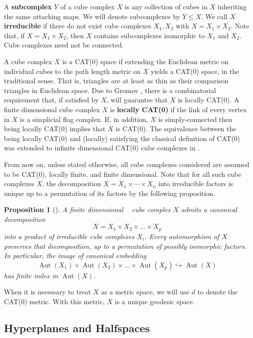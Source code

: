 \documentclass{amsart}
\newtheorem{proposition}[theorem]{Proposition}
\theoremstyle{definition}
\newtheorem*{Notation warning}{Warning on notations}
\newtheorem*{Sketch of proof}{Sketch of proof for Theorem C}
\DeclareMathOperator{\cat}{CAT(0)}
\def\aut{\mathop{\mathrm{Aut}}\nolimits}
\begin{document}
\begin{sloppypar}
A {\bf subcomplex} $Y$ of a cube complex $X$ is any collection of cubes in $X$ inheriting the same attaching maps. We will denote subcomplexes by $Y\le X$. We call $X$ {\bf irreducible} if there do not exist cube complexes $X_1,X_2$ with $X=X_1\times X_2$. Note that, if $X=X_1\times X_2$, then $X$ contains subcomplexes isomorphic to $X_1$ and $X_2$. Cube complexes need not be connected.
\medskip

A cube complex $X$ is a CAT(0) space if extending the Euclidean metric on individual cubes to the path length metric on $X$ yields a CAT(0) space, in the traditional sense. That is, triangles are at least as thin as their comparison triangles in Euclidean space. Due to Gromov \cite{Gro87}, there is a combinatorial requirement that, if satisfied by $X$, will guarantee that $X$ is locally CAT(0). A finite dimensional cube complex $X$ is {\bf locally CAT(0)} if the link of every vertex in $X$ is a simplicial flag complex. If, in addition, $X$ is simply-connected then being locally CAT(0) implies that $X$ is CAT(0). The equivalence between the being locally CAT(0) and (locally) satisfying the classical definition of CAT(0) was extended to infinite dimensional CAT(0) cube complexes in \cite{https://doi.org/10.1112/jtopol/jts035}.
\medskip

From now on, unless stated otherwise, all cube complexes considered are assumed to be CAT(0), locally finite, and finite dimensional. Note that for all such cube complexes $X$, the decomposition $X=X_1\times\cdots\times X_n$ into irreducible factors is unique up to a permutation of its factors by the following proposition.
\medskip
\begin{proposition}[\cite{Caprace_2011}]\label{p:product decomposition}
    A finite dimensional $\cat$ cube complex $X$ admits a canonical decomposition
    \[
    X=X_1\times X_2\times \ldots \times X_p
    \]
    into a product of irreducible cube complexes $X_i$. Every automorphism of $X$ preserves that decomposition, up to a permutation of possibly isomorphic factors. In particular, the image of canonical embedding
    \[
    \aut(X_1)\times \aut(X_2)\times \ldots \times \aut(X_p)\hookrightarrow \aut(X)
    \]
    has finite index in $\aut(X)$.
\end{proposition}
When it is necessary to treat $X$ as a metric space, we will use $d$ to denote the CAT(0) metric. With this metric, $X$ is a unique geodesic space.

\subsection{Hyperplanes and Halfspaces}


\end{sloppypar}
\end{document}
